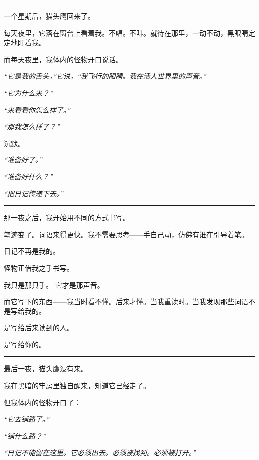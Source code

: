 \vspace{0.5em}\noindent\rule{\textwidth}{0.5pt}\vspace{0.5em}

\noindent 一个星期后，猫头鹰回来了。

\noindent 每天夜里，它落在窗台上看着我。不唱。不叫。就待在那里，一动不动，黑眼睛定定地盯着我。

\noindent 而每天夜里，我体内的怪物开口说话。

\noindent \textit{“它是我的舌头，”它说，“我飞行的眼睛。我在活人世界里的声音。”}

\noindent \textit{“它为什么来？”}

\noindent \textit{“来看看你怎么样了。”}

\noindent \textit{“那我怎么样了？”}

\noindent 沉默。

\noindent \textit{“准备好了。”}

\noindent \textit{“准备好什么？”}

\noindent \textit{“把日记传递下去。”}

\vspace{0.5em}\noindent\rule{\textwidth}{0.5pt}\vspace{0.5em}

\noindent 那一夜之后，我开始用不同的方式书写。

\noindent 笔迹变了。词语来得更快。我不需要思考——手自己动，仿佛有谁在引导着笔。

\noindent 日记不再是我的。

\noindent 怪物正借我之手书写。

\noindent 我只是那只手。
它才是那声音。

\noindent 而它写下的东西——我当时看不懂。后来才懂。当我重读时。当我发现那些词语不是写给我的。

\noindent 是写给后来读到的人。

\noindent 是写给你的。

\vspace{0.5em}\noindent\rule{\textwidth}{0.5pt}\vspace{0.5em}

\noindent 最后一夜，猫头鹰没有来。

\noindent 我在黑暗的牢房里独自醒来，知道它已经走了。

\noindent 但我体内的怪物开口了：

\noindent \textit{“它去铺路了。”}

\noindent \textit{“铺什么路？”}

\noindent \textit{“日记不能留在这里。它必须出去。必须被找到。必须被打开。”}

